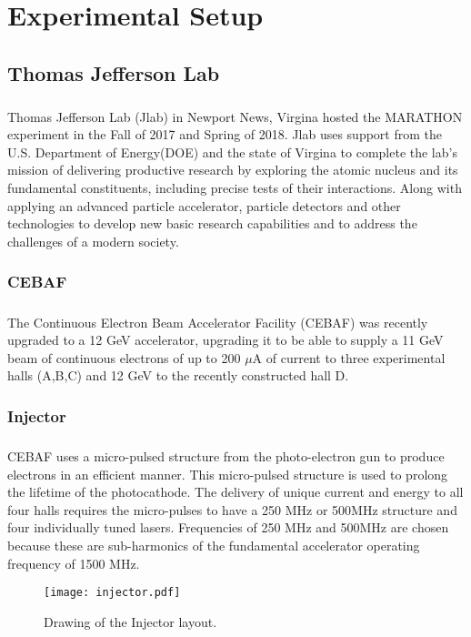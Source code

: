 


\chapter{ Experimental Setup} \label{ch:ExpUp}

\section{Thomas Jefferson Lab}
\paragraph{}Thomas Jefferson Lab (Jlab) in Newport News, Virgina hosted the MARATHON experiment in the Fall of 2017 and Spring of 2018. Jlab uses support from the U.S. Department of Energy(DOE) and the state of Virgina to complete the lab's mission of delivering productive research by exploring the atomic nucleus and its fundamental constituents, including precise tests of their interactions. Along with applying an advanced particle accelerator, particle detectors and other technologies to develop new basic research capabilities and to address the challenges of a modern society.
\subsection{CEBAF}\label{sec:cebaf}
	\paragraph{}The Continuous Electron Beam Accelerator Facility (CEBAF) was recently upgraded to a 12 GeV accelerator, upgrading it to be able to supply a 11 GeV beam of continuous electrons of up to 200 $\mu$A of current to three experimental halls (A,B,C) and 12 GeV to the recently constructed hall D. 
\subsection{Injector}
	\paragraph{} CEBAF uses a micro-pulsed structure from the photo-electron gun to produce electrons in an efficient manner. This micro-pulsed structure is used to prolong the lifetime of the photocathode. The delivery of unique current and energy to all four halls requires the micro-pulses to have a 250 MHz or 500MHz structure and four individually tuned lasers. Frequencies of 250 MHz and 500MHz are chosen because these are sub-harmonics of the fundamental accelerator operating frequency of 1500 MHz. 
	\begin{figure}[h]
	\centering
	\caption{Drawing of the Injector layout. }
	\label{fig:inj}
	\texttt{[image: injector.pdf]} 
	\end{figure} 
